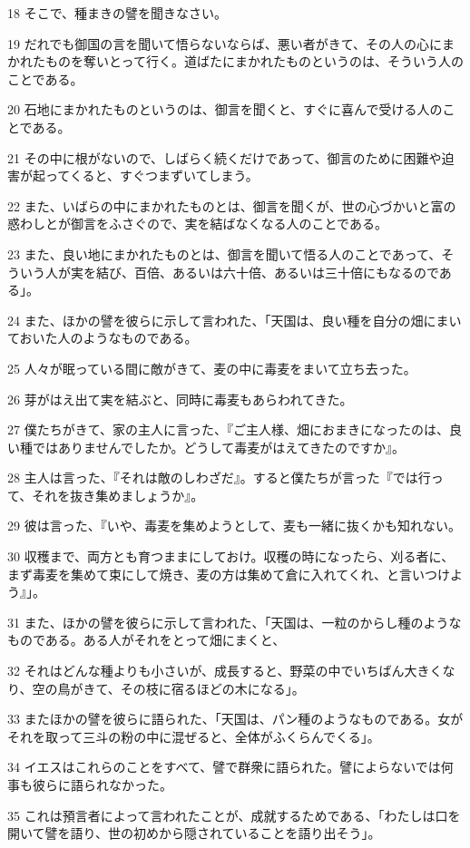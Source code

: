 \par 18 そこで、種まきの譬を聞きなさい。
\par 19 だれでも御国の言を聞いて悟らないならば、悪い者がきて、その人の心にまかれたものを奪いとって行く。道ばたにまかれたものというのは、そういう人のことである。
\par 20 石地にまかれたものというのは、御言を聞くと、すぐに喜んで受ける人のことである。
\par 21 その中に根がないので、しばらく続くだけであって、御言のために困難や迫害が起ってくると、すぐつまずいてしまう。
\par 22 また、いばらの中にまかれたものとは、御言を聞くが、世の心づかいと富の惑わしとが御言をふさぐので、実を結ばなくなる人のことである。
\par 23 また、良い地にまかれたものとは、御言を聞いて悟る人のことであって、そういう人が実を結び、百倍、あるいは六十倍、あるいは三十倍にもなるのである」。
\par 24 また、ほかの譬を彼らに示して言われた、「天国は、良い種を自分の畑にまいておいた人のようなものである。
\par 25 人々が眠っている間に敵がきて、麦の中に毒麦をまいて立ち去った。
\par 26 芽がはえ出て実を結ぶと、同時に毒麦もあらわれてきた。
\par 27 僕たちがきて、家の主人に言った、『ご主人様、畑におまきになったのは、良い種ではありませんでしたか。どうして毒麦がはえてきたのですか』。
\par 28 主人は言った、『それは敵のしわざだ』。すると僕たちが言った『では行って、それを抜き集めましょうか』。
\par 29 彼は言った、『いや、毒麦を集めようとして、麦も一緒に抜くかも知れない。
\par 30 収穫まで、両方とも育つままにしておけ。収穫の時になったら、刈る者に、まず毒麦を集めて束にして焼き、麦の方は集めて倉に入れてくれ、と言いつけよう』」。
\par 31 また、ほかの譬を彼らに示して言われた、「天国は、一粒のからし種のようなものである。ある人がそれをとって畑にまくと、
\par 32 それはどんな種よりも小さいが、成長すると、野菜の中でいちばん大きくなり、空の鳥がきて、その枝に宿るほどの木になる」。
\par 33 またほかの譬を彼らに語られた、「天国は、パン種のようなものである。女がそれを取って三斗の粉の中に混ぜると、全体がふくらんでくる」。
\par 34 イエスはこれらのことをすべて、譬で群衆に語られた。譬によらないでは何事も彼らに語られなかった。
\par 35 これは預言者によって言われたことが、成就するためである、「わたしは口を開いて譬を語り、世の初めから隠されていることを語り出そう」。
